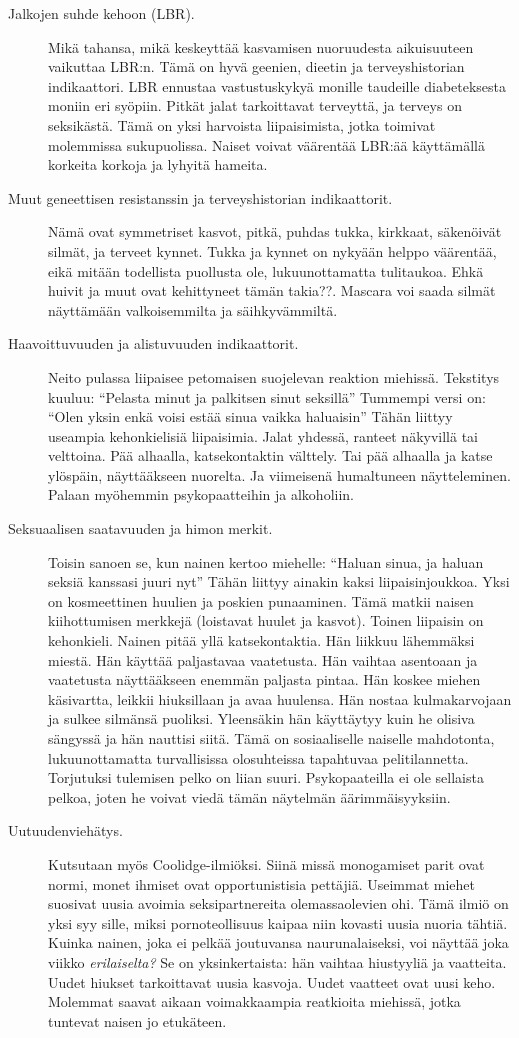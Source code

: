 \begin{description}
\item[Jalkojen suhde kehoon (LBR).] Mikä tahansa, mikä keskeyttää kasvamisen nuoruudesta aikuisuuteen vaikuttaa LBR:n. Tämä on hyvä geenien, dieetin ja terveyshistorian indikaattori. LBR ennustaa vastustuskykyä monille taudeille diabeteksesta moniin eri syöpiin. Pitkät jalat tarkoittavat terveyttä, ja terveys on seksikästä. Tämä on yksi harvoista liipaisimista, jotka toimivat molemmissa sukupuolissa. Naiset voivat väärentää LBR:ää käyttämällä korkeita korkoja ja lyhyitä hameita.
\item[Muut geneettisen resistanssin ja terveyshistorian indikaattorit.] Nämä ovat symmetriset kasvot, pitkä, puhdas tukka, kirkkaat, säkenöivät silmät, ja terveet kynnet. Tukka ja kynnet on nykyään helppo väärentää, eikä mitään todellista puollusta ole, lukuunottamatta tulitaukoa. Ehkä huivit ja muut ovat kehittyneet tämän takia??. Mascara voi saada silmät näyttämään valkoisemmilta ja säihkyvämmiltä.
\item[Haavoittuvuuden ja alistuvuuden indikaattorit.] Neito pulassa liipaisee petomaisen suojelevan reaktion miehissä. Tekstitys kuuluu: ``Pelasta minut ja palkitsen sinut seksillä'' Tummempi versi on: ``Olen yksin enkä voisi estää sinua vaikka haluaisin'' Tähän liittyy useampia kehonkielisiä liipaisimia. Jalat yhdessä, ranteet näkyvillä tai velttoina. Pää alhaalla, katsekontaktin välttely. Tai pää alhaalla ja katse ylöspäin, näyttääkseen nuorelta. Ja viimeisenä humaltuneen näytteleminen. Palaan myöhemmin psykopaatteihin ja alkoholiin.
\item[Seksuaalisen saatavuuden ja himon merkit.] Toisin sanoen se, kun nainen kertoo miehelle: ``Haluan sinua, ja haluan seksiä kanssasi juuri nyt'' Tähän liittyy ainakin kaksi liipaisinjoukkoa. Yksi on kosmeettinen huulien ja poskien punaaminen. Tämä matkii naisen kiihottumisen merkkejä (loistavat huulet ja kasvot). Toinen liipaisin on kehonkieli. Nainen pitää yllä katsekontaktia. Hän liikkuu lähemmäksi miestä. Hän käyttää paljastavaa vaatetusta. Hän vaihtaa asentoaan ja vaatetusta näyttääkseen enemmän paljasta pintaa. Hän koskee miehen käsivartta, leikkii hiuksillaan ja avaa huulensa. Hän nostaa kulmakarvojaan ja sulkee silmänsä puoliksi. Yleensäkin hän käyttäytyy kuin he olisiva sängyssä ja hän nauttisi siitä. Tämä on sosiaaliselle naiselle mahdotonta, lukuunottamatta turvallisissa olosuhteissa tapahtuvaa pelitilannetta. Torjutuksi tulemisen pelko on liian suuri. Psykopaateilla ei ole sellaista pelkoa, joten he voivat viedä tämän näytelmän äärimmäisyyksiin.
\item[Uutuudenviehätys.] Kutsutaan myös Coolidge-ilmiöksi. Siinä missä monogamiset parit ovat normi, monet ihmiset ovat opportunistisia pettäjiä. Useimmat miehet suosivat uusia avoimia seksipartnereita olemassaolevien ohi. Tämä ilmiö on yksi syy sille, miksi pornoteollisuus kaipaa niin kovasti uusia nuoria tähtiä. Kuinka nainen, joka ei pelkää joutuvansa naurunalaiseksi, voi näyttää joka viikko \emph{erilaiselta?} Se on yksinkertaista: hän vaihtaa hiustyyliä ja vaatteita. Uudet hiukset tarkoittavat uusia kasvoja. Uudet vaatteet ovat uusi keho. Molemmat saavat aikaan voimakkaampia reatkioita miehissä, jotka tuntevat naisen jo etukäteen.
\end{description}
